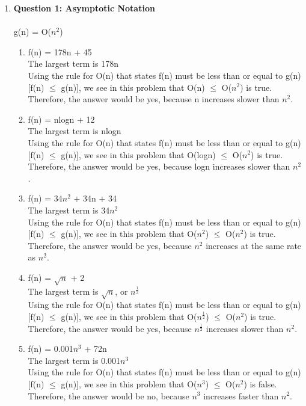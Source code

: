 \documentclass[11pt]{article}
\begin{document}
\begin{enumerate}
\item
\textbf{Question 1: Asymptotic Notation} \\ \\ %
g(n) = O($n^{2}$)
\begin{enumerate}[label=(\alph*)]
\item %
f(n) = 178n + 45 \\ 
The largest term is 178n \\
Using the rule for O(n) that states f(n) must be less than or equal to g(n) [f(n) $\leq$ g(n)],
we see in this problem that O(n) $\leq$ O($n^{2}$) is true. \\
Therefore, the answer would be yes, because n increases slower than $n^{2}$. \\
\item %
f(n) = nlogn + 12 \\
The largest term is nlogn \\
Using the rule for O(n) that states f(n) must be less than or equal to g(n) [f(n) $\leq$ g(n)],
we see in this problem that O(logn) $\leq$ O($n^{2}$) is true. \\
Therefore, the answer would be yes, because logn increases slower than $n^{2}$. \\
\item %
f(n) = 34$n^{2}$ + 34n + 34 \\
The largest term is 34$n^{2}$ \\
Using the rule for O(n) that states f(n) must be less than or equal to g(n) [f(n) $\leq$ g(n)],
we see in this problem that O($n^{2}$) $\leq$ O($n^{2}$) is true. \\
Therefore, the answer would be yes, because $n^{2}$ increases at the same rate as $n^{2}$. \\
\item %
f(n) = $\sqrt{n}$ + 2 \\
The largest term is $\sqrt{n}$, or $n^{\frac{1}{2}}$ \\
Using the rule for O(n) that states f(n) must be less than or equal to g(n) [f(n) $\leq$ g(n)],
we see in this problem that O($n^{\frac{1}{2}}$) $\leq$ O($n^{2}$) is true. \\
Therefore, the answer would be yes, because $n^{\frac{1}{2}}$ increases slower than $n^{2}$. \\
\item %
f(n) = 0.001$n^{3}$ + 72n \\
The largest term is 0.001$n^{3}$ \\
Using the rule for O(n) that states f(n) must be less than or equal to g(n) [f(n) $\leq$ g(n)],
we see in this problem that O($n^{3}$) $\leq$ O($n^{2}$) is false. \\
Therefore, the answer would be no, because $n^{3}$ increases faster than $n^{2}$. \\
\end{enumerate}


\end{enumerate}
\end{document}
